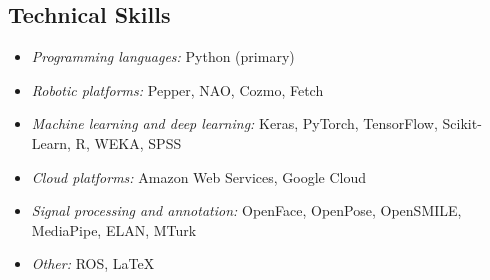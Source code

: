 \documentclass[11pt,letterpaper]{article}
\begin{document}
\subsection*{Technical Skills}
\begin{itemize}
  \item \emph{Programming languages:} Python (primary)
  \item \emph{Robotic platforms:} Pepper, NAO, Cozmo, Fetch
  \item \emph{Machine learning and deep learning:} Keras, PyTorch, TensorFlow, Scikit-Learn, R, WEKA, SPSS
  \item \emph{Cloud platforms:} Amazon Web Services, Google Cloud
  \item \emph{Signal processing and annotation:} OpenFace, OpenPose, OpenSMILE, MediaPipe, ELAN, MTurk
  \item \emph{Other:} ROS, \LaTeX
\end{itemize}
\end{document}
